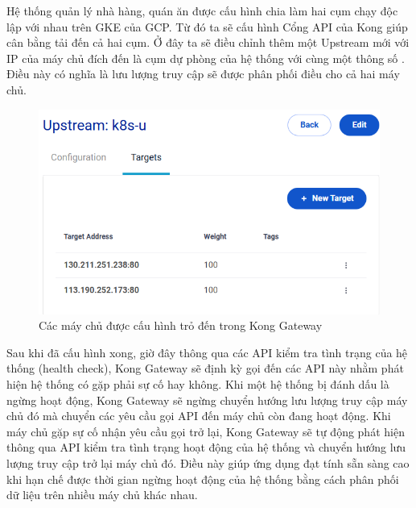 Hệ thống quản lý nhà hàng, quán ăn được cấu hình chia làm hai cụm chạy độc lập với nhau trên GKE của GCP.
Từ đó ta sẽ cấu hình Cổng API của Kong giúp cân bằng tải đến cả hai cụm.
Ở đây ta sẽ điều chỉnh thêm một Upstream mới với IP của máy chủ đích đến là cụm dự phòng của hệ thống với cùng một thông số .
Điều này có nghĩa là lưu lượng truy cập sẽ được phân phối điều cho cả hai máy chủ.
\begin{figure}
    \centering
    \includegraphics[width=1\linewidth]{images/hChip/test/kong-upstream.png}
    \caption{Các máy chủ được cấu hình trỏ đến trong Kong Gateway}
    \label{fig:kong-upstream}
\end{figure}
Sau khi đã cấu hình xong, giờ đây thông qua các API kiểm tra tình trạng của hệ thống (health check), Kong Gateway sẽ định kỳ gọi đến các API này nhằm phát hiện hệ thống có gặp phải sự cố hay không.
Khi một hệ thống bị đánh dấu là ngừng hoạt động, Kong Gateway sẽ ngừng chuyển hướng lưu lượng truy cập máy chủ đó mà chuyển các yêu cầu gọi API đến máy chủ còn đang hoạt động.
Khi máy chủ gặp sự cố nhận yêu cầu gọi trở lại, Kong Gateway sẽ tự động phát hiện thông qua API kiểm tra tình trạng hoạt động của hệ thống và chuyển hướng lưu lượng truy cập trở lại máy chủ đó.
Điều này giúp ứng dụng đạt tính sẵn sàng cao khi hạn chế được thời gian ngừng hoạt động của hệ thống bằng cách phân phối dữ liệu trên nhiều máy chủ khác nhau.